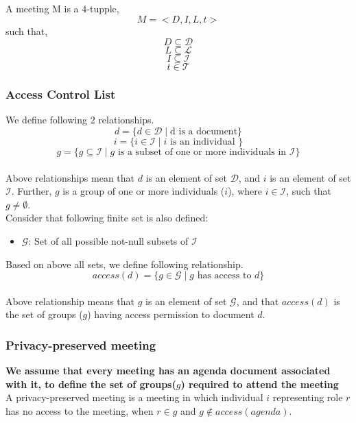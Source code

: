 \begin{spacing}{1.0}
    \noindent
    A meeting M is a 4-tupple,
        \[ M = < D, I, L, t > \]
    such that,
        \[ D \subseteq \mathcal{D} \]
        \[ L \subseteq \mathcal{L} \]
        \[ I \subseteq \mathcal{I} \]
        \[ t \in \mathcal{T} \]

    \subsubsection{Access Control List}
    \noindent
    We define following 2 relationships.
    \[ d = \{ d \in \mathcal{D} \mid \text{d is a document} \} \]
    \[ i = \{ i \in \mathcal{I} \mid i \text{ is an individual } \} \]
    \[ g = \{ g \subseteq \mathcal{I} \mid g \text{ is a subset of one or more individuals in } \mathcal{I} \} \] \\ 
    
    \noindent
    Above relationships mean that $d$ is an element of set $\mathcal{D}$, and $i$ is an element of set $\mathcal{I}$. Further, $g$ is a group of one or more individuals ($i$), where $i \in \mathcal{I}$, such that $g \ne \emptyset$.\\ 

    \noindent
    Consider that following finite set is also defined:
    \begin{itemize}
        \item $\mathcal{G}$: Set of all possible not-null subsets of $\mathcal{I}$
    \end{itemize}
    Based on above all sets, we define following relationship.
    \[ access(d) = \{ g \in \mathcal{G} \mid g \text{ has access to } d \} \] \\ 
    \noindent
    Above relationship means that $g$ is an element of set $\mathcal{G}$, and that $access(d)$ is the set of groups ($g$) having access permission to document $d$.\\

    \subsubsection{Privacy-preserved meeting}
    \noindent
    \textbf{We assume that every meeting has an agenda document associated with it, to define the set of groups($g$) required to attend the meeting}\\
    \noindent
    A privacy-preserved meeting is a meeting in which individual $i$ representing role $r$ has no access to the meeting, when $r \in g$ and $g \notin access(agenda)$.


\end{spacing}
